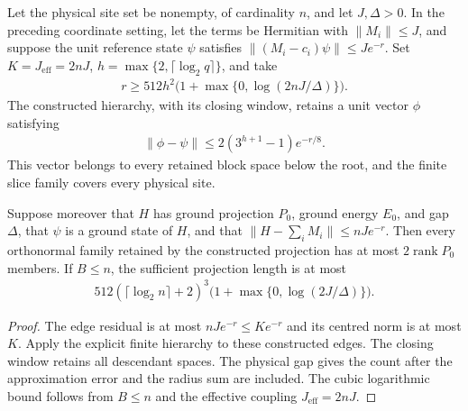 \begin{lemma}
    \label{thm:hastings05_coordinate_slice_approximation}
    \leanok
    Let the physical site set be nonempty, of cardinality $n$, and let
    $J,\Delta>0$. In the preceding coordinate setting, let the terms be
    Hermitian with $\|M_i\|\le J$, and suppose the unit reference state
    $\psi$ satisfies $\|(M_i-c_i)\psi\|\le Je^{-r}$.
    Set $K=J_{\mathrm{eff}}=2nJ$, $h=\max\{2,\lceil\log_2q\rceil\}$,
    and take
    \begin{align*}
        r\ge512h^2\bigl(1+\max\{0,\log(2nJ/\Delta)\}\bigr).
    \end{align*}
    The constructed hierarchy, with its closing window, retains a unit
    vector $\phi$ satisfying
    \begin{align*}
        \|\phi-\psi\|\le2(3^{h+1}-1)e^{-r/8}.
    \end{align*}
    This vector belongs to every retained block space below the root,
    and the finite slice family covers every physical site.

    Suppose moreover that $H$ has ground projection $P_0$, ground energy
    $E_0$, and gap $\Delta$, that $\psi$ is a ground state of $H$, and that
    $\|H-\sum_iM_i\|\le nJe^{-r}$. Then every orthonormal family retained
    by the constructed projection has at most $2\operatorname{rank}P_0$
    members. If $B\le n$, the sufficient projection length is at most
    \begin{align*}
        512(\lceil\log_2n\rceil+2)^3
        \bigl(1+\max\{0,\log(2J/\Delta)\}\bigr).
    \end{align*}
\end{lemma}
\begin{proof}\leanok
    The edge residual is at most $nJe^{-r}\le Ke^{-r}$ and its centred
    norm is at most $K$. Apply the explicit finite hierarchy to these
    constructed edges. The closing window retains all descendant spaces.
    The physical gap gives the count after the approximation error and
    the radius sum are included. The cubic logarithmic bound follows from
    $B\le n$ and the effective coupling $J_{\mathrm{eff}}=2nJ$.
\end{proof}

